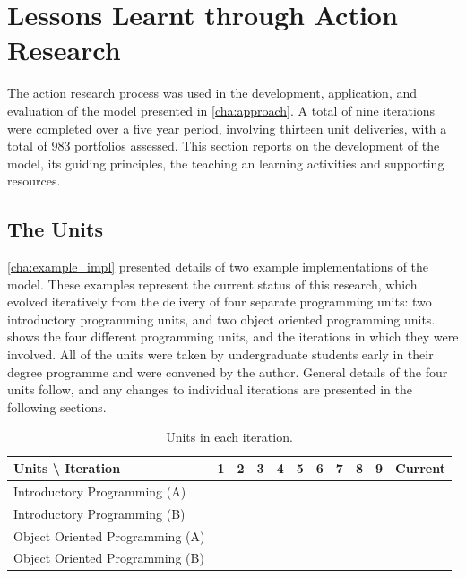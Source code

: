 

\section{Lessons Learnt through Action Research} %
\label{sec:lessons_learnt_from_action_research}

The action research process was used in the development, application, and evaluation of the model presented in \cref{cha:approach}. A total of nine iterations were completed over a five year period, involving thirteen unit deliveries, with a total of 983 portfolios assessed. This section reports on the development of the model, its guiding principles, the teaching an learning activities and supporting resources.

\subsection{The Units} %
\label{sub:the_units}

\cref{cha:example_impl} presented details of two example implementations of the model. These examples represent the current status of this research, which evolved iteratively from the delivery of four separate programming units: two introductory programming units, and two object oriented programming units.  shows the four different programming units, and the iterations in which they were involved. All of the units were taken by undergraduate students early in their degree programme and were convened by the author. General details of the four units follow, and any changes to individual iterations are presented in the following sections.

\begin{table}[htb]
  \footnotesize
  \renewcommand{\arraystretch}{1.3}
  \caption{Units in each iteration.}
  \label{tbl:units_iteration}
  \centering
	\begin{tabular}{l|c|c|c|c|c|c|c|c|c|c}
		Units \textbackslash{} Iteration & 1 & 2 & 3 & 4 & 5 & 6 & 7 & 8 & 9 & Current \\ \hline
		Introductory Programming (A) & \checkmark & ~ & \checkmark & ~           & \checkmark & \checkmark & ~           & \checkmark & ~ & \checkmark           \\ 
		Introductory Programming (B)    & ~           & ~           & ~           & ~           & ~           & ~           & \checkmark & \checkmark & \checkmark & \checkmark \\ \hline
		Object Oriented Programming (A) & ~           & \checkmark & ~           & \checkmark & ~           & ~           & \checkmark & ~           & \checkmark & \checkmark \\ 
		Object Oriented Programming (B) & ~           & ~           & ~           & ~           & ~           & ~           & ~           & ~           & \checkmark & \checkmark
	\end{tabular}
\end{table}

